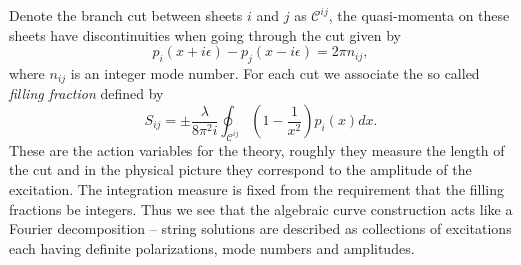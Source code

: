 Denote the branch cut between sheets $i$ and $j$ as $\mathcal{C}^{ij}$, the quasi-momenta on these sheets have discontinuities when going through the cut given by
\begin{equation}
	p_i(x + i\epsilon) - p_j(x - i\epsilon) = 2 \pi n_{ij},
	\label{eq:cut_condition}
\end{equation}  
where $n_{ij}$ is an integer mode number.
For each cut we associate the so called \emph{filling fraction} defined by
\begin{equation}
	\label{eq:filling}
	S_{ij} = \pm \frac{\lambda}{8 \pi^2 i} \oint_{\mathcal{C}^{ij}} \left( 1 - \frac{1}{x^2} \right) p_i(x) dx.
\end{equation}
These are the action variables for the theory, roughly they measure the length of the cut and in the physical picture they correspond to the amplitude of the excitation. 
The integration measure is fixed from the requirement that the filling fractions be integers. 
Thus we see that the algebraic curve construction acts like a Fourier decomposition -- string solutions are described as collections of excitations each having definite polarizations, mode numbers and amplitudes.

